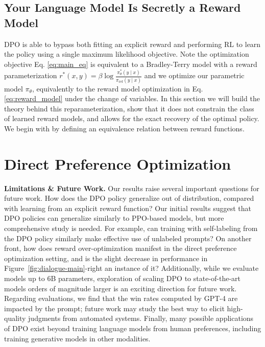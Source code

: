 \subsection{Your Language Model Is Secretly a Reward Model} DPO is able to bypass both fitting an explicit reward and performing RL to learn the policy using a single maximum likelihood objective. Note the optimization objective Eq. \ref{eq:main_eq} is equivalent to a Bradley-Terry model with a reward parameterization $r^*(x, y) = \beta \log\frac{\pi^*_\theta(y \mid x)}{\pi_\text{ref}(y \mid x)}$ and we optimize our parametric model $\pi_{\theta}$, equivalently to the reward model optimization in Eq. \ref{eq:reward_model} under the change of variables. In this section we will build the theory behind this reparameterization, show that it does not constrain the class of learned reward models, and allows for the exact recovery of the optimal policy. We begin with by defining an equivalence relation between reward functions.

\section{Direct Preference Optimization}\label{sec:DPO}

\textbf{Limitations \& Future Work.} Our results raise several important questions for future work. How does the DPO policy generalize out of distribution, compared with learning from an explicit reward function? Our initial results suggest that DPO policies can generalize similarly to PPO-based models, but more comprehensive study is needed. For example, can training with self-labeling from the DPO policy similarly make effective use of unlabeled prompts? On another front, how does reward over-optimization manifest in the direct preference optimization setting, and is the slight decrease in performance in Figure~\ref{fig:dialogue-main}-right an instance of it? Additionally, while we evaluate models up to 6B parameters, exploration of scaling DPO to state-of-the-art models orders of magnitude larger is an exciting direction for future work. Regarding evaluations, we find that the win rates computed by GPT-4 are impacted by the prompt; future work may study the best way to elicit high-quality judgments from automated systems. Finally, many possible applications of DPO exist beyond training language models from human preferences, including training generative models in other modalities.

